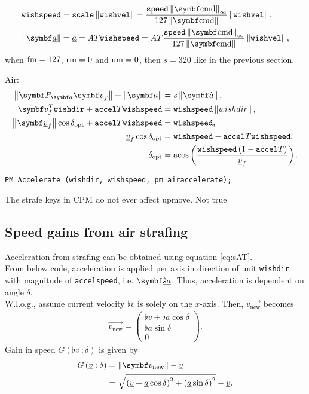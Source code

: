 \begin{align*}
\texttt{wishspeed} &= \texttt{scale} \norm{\texttt{wishvel}} =
\frac{\texttt{speed}\norm{\vec{\cmd}}_{\infty}}{127\norm{\vec{\cmd}}} \norm{\texttt{wishvel}},\\
\norm{\vec{\flat{a}}} &= \flat{a} = AT \texttt{wishspeed} = AT\frac{\texttt{speed}\norm{\vec{\cmd}}_{\infty}}{127\norm{\vec{\cmd}}} \norm{\texttt{wishvel}},
\end{align*}
when $\operatorname{fm} = 127$, $\operatorname{rm} = 0$ and $\operatorname{um} = 0$, then $s = 320$ like in the previous section.

Air:
\begin{align}
\nonumber
\norm{\projmat{a} \vec{\flat{v}}_f} + \norm{\vec{\flat{a}}} &= s \norm{\uvec{\flat{a}}},\\
\nonumber
\vec{v}_{f}^T\texttt{wishdir} + \texttt{accel}T\texttt{wishspeed} &= \texttt{wishspeed}\norm{wishdir},\\
\nonumber
\norm{\vec{\flat{v}}_f} \cos{\delta_{\opt}} + \texttt{accel}T\texttt{wishspeed} &= \texttt{wishspeed},\\
\nonumber
\flat{v}_f \cos{\delta_{\opt}} &= \texttt{wishspeed} - \texttt{accel}T\texttt{wishspeed},\\
\delta_{\opt} &= \acos\left( \frac{\texttt{wishspeed} \left(1 - \texttt{accel}T\right)}{\flat{v}_f} \right).
\end{align}

\texttt{PM\_Accelerate (wishdir, wishspeed, pm\_airaccelerate);}

The strafe keys in CPM do not ever affect upmove. Not true


\subsection{Speed gains from air strafing}
\label{sec:speed_gains}
Acceleration from strafing can be obtained using equation \eqref{eq:sAT}.\\
From below code, acceleration is applied per axis in direction of unit \texttt{wishdir} with magnitude of \texttt{accelspeed}, i.e. $\uvec{\flat{s}}\flat{a}$.
Thus, acceleration is dependent on angle $\delta$.\\
W.l.o.g., assume current velocity $\flat{v}$ is solely on the $x$-axis. Then, $\vec{v_\text{new}}$ becomes
\begin{align*}
\vec{v_\text{new}} =
\begin{pmatrix}
\flat{v} + \flat{a}\cos\delta\\\flat{a}\sin\delta\\0
\end{pmatrix}.
\end{align*}
Gain in speed $G\left(\flat{v}\ ;\delta \right)$ is given by
\begin{align*}
G\left(\flat{v}\ ;\delta \right) &= \norm{\vec{v_\text{new}}} - \flat{v}\\
&= \sqrt{\left(\flat{v} + \flat{a}\cos\delta \right)^2 + \left(\flat{a}\sin\delta \right)^2} - \flat{v}.
\end{align*}

